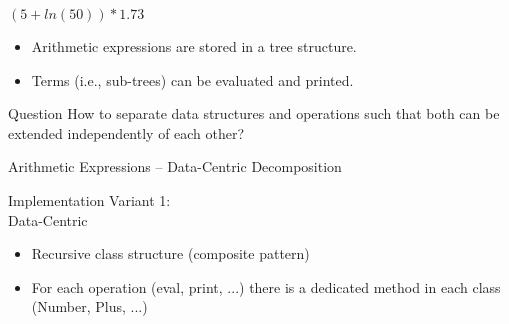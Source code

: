 \begin{frame}{\myframetitle}
	\begin{fancycolumns}[widths={60}]
		\begin{exampletight}{$(5 + ln(50)) * 1.73$}
			\centering
		\end{exampletight}
	\nextcolumn
		\begin{example}{}
			\begin{itemize}
				\item Arithmetic expressions are stored in a tree structure.
				\item Terms (i.e., sub-trees) can be evaluated and printed.
			\end{itemize}
		\end{example}
		\begin{note}{Question}
			How to separate data structures and operations such that both can be extended independently of each other?
		\end{note}
	\end{fancycolumns}
\end{frame}

\begin{frame}{Arithmetic Expressions -- Data-Centric Decomposition}
	\begin{fancycolumns}[widths={40},animation=none]
		\begin{definition}{Implementation Variant 1:\\Data-Centric}
			\begin{itemize}
				\item Recursive class structure (composite pattern)
				\item For each operation (eval, print, ...) there is a dedicated method in each class (Number, Plus, ...) 				
			\end{itemize}
		\end{definition}
	\nextcolumn
		\begin{exampletight}{}
		\end{exampletight}
	\end{fancycolumns}
\end{frame}

